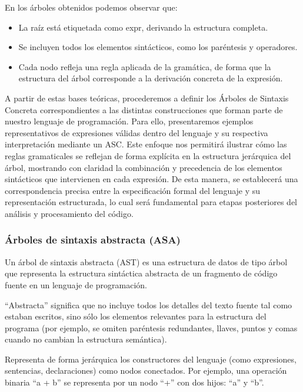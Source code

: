 \documentclass[a4paper,12pt]{article}
\begin{document}
\vspace{1cm}

En los árboles obtenidos podemos observar que:

\begin{itemize}
    \item La raíz está etiquetada como expr, derivando la estructura completa.
    \item Se incluyen todos los elementos sintácticos, como los paréntesis y operadores.
   \item Cada nodo refleja una regla aplicada de la gramática, de forma que la estructura del
árbol corresponde a la derivación concreta de la expresión.
\end{itemize}

A partir de estas bases teóricas, procederemos a definir los Árboles de Sintaxis Concreta correspondientes a las distintas construcciones que forman parte de nuestro lenguaje de programación. Para ello, presentaremos ejemplos representativos de expresiones válidas dentro del lenguaje y su respectiva interpretación mediante un ASC. Este enfoque nos permitirá ilustrar cómo las reglas gramaticales se reflejan de forma explícita en la estructura jerárquica del árbol, mostrando con claridad la combinación y precedencia de los elementos sintácticos que intervienen en cada expresión. De esta manera, se establecerá una correspondencia precisa entre la especificación formal del lenguaje y su representación estructurada, lo cual será fundamental para etapas posteriores del análisis y procesamiento del código.




\subsubsection{Árboles de sintaxis abstracta (ASA)}

Un árbol de sintaxis abstracta (AST) es una estructura de datos de tipo árbol que representa la estructura sintáctica abstracta de un fragmento de código fuente en un lenguaje de programación. 

“Abstracta” significa que no incluye todos los detalles del texto fuente tal como estaban escritos, sino sólo los elementos relevantes para la estructura del programa (por ejemplo, se omiten paréntesis redundantes, llaves, puntos y comas cuando no cambian la estructura semántica). 

Representa de forma jerárquica los constructores del lenguaje (como expresiones, sentencias, declaraciones) como nodos conectados. Por ejemplo, una operación binaria “a + b” se representa por un nodo “+” con dos hijos: “a” y “b”. 
\end{document}
